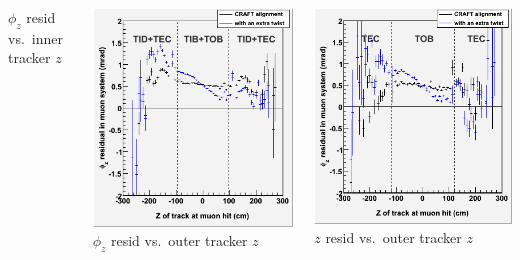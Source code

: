 \documentclass[compress]{beamer}
\begin{document}
\begin{frame}
\vspace{0.2 cm}
\begin{columns}
\scriptsize $\phi_z$ resid vs.\ inner tracker $z$

\includegraphics[width=\linewidth]{phiresid_from_tracker_inner_twist2.png}
\scriptsize $\phi_z$ resid vs.\ outer tracker $z$

\includegraphics[width=\linewidth]{phiresid_from_tracker_outer_twist2.png}
\scriptsize $z$ resid vs.\ outer tracker $z$


\end{columns}
\end{frame}
\end{document}

